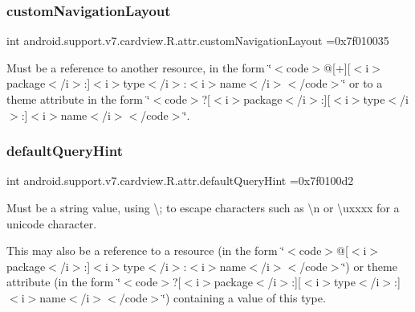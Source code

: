 \subsubsection{\texorpdfstring{custom\+Navigation\+Layout}{customNavigationLayout}}
{\footnotesize\ttfamily int android.\+support.\+v7.\+cardview.\+R.\+attr.\+custom\+Navigation\+Layout =0x7f010035\hspace{0.3cm}{\ttfamily [static]}}

Must be a reference to another resource, in the form \char`\"{}$<$code$>$@\mbox{[}+\mbox{]}\mbox{[}$<$i$>$package$<$/i$>$\+:\mbox{]}$<$i$>$type$<$/i$>$\+:$<$i$>$name$<$/i$>$$<$/code$>$\char`\"{} or to a theme attribute in the form \char`\"{}$<$code$>$?\mbox{[}$<$i$>$package$<$/i$>$\+:\mbox{]}\mbox{[}$<$i$>$type$<$/i$>$\+:\mbox{]}$<$i$>$name$<$/i$>$$<$/code$>$\char`\"{}. \mbox{\label{classandroid_1_1support_1_1v7_1_1cardview_1_1R_1_1attr_a48bf1b18dbbe3f6b6ec0ba59da897ce9}} 
\subsubsection{\texorpdfstring{default\+Query\+Hint}{defaultQueryHint}}
{\footnotesize\ttfamily int android.\+support.\+v7.\+cardview.\+R.\+attr.\+default\+Query\+Hint =0x7f0100d2\hspace{0.3cm}{\ttfamily [static]}}

Must be a string value, using \textquotesingle{}\textbackslash{};\textquotesingle{} to escape characters such as \textquotesingle{}\textbackslash{}n\textquotesingle{} or \textquotesingle{}\textbackslash{}uxxxx\textquotesingle{} for a unicode character. 

This may also be a reference to a resource (in the form \char`\"{}$<$code$>$@\mbox{[}$<$i$>$package$<$/i$>$\+:\mbox{]}$<$i$>$type$<$/i$>$\+:$<$i$>$name$<$/i$>$$<$/code$>$\char`\"{}) or theme attribute (in the form \char`\"{}$<$code$>$?\mbox{[}$<$i$>$package$<$/i$>$\+:\mbox{]}\mbox{[}$<$i$>$type$<$/i$>$\+:\mbox{]}$<$i$>$name$<$/i$>$$<$/code$>$\char`\"{}) containing a value of this type. \mbox{\label{classandroid_1_1support_1_1v7_1_1cardview_1_1R_1_1attr_ae210dc8e855ef1c7aa0c74827cef736b}} 
